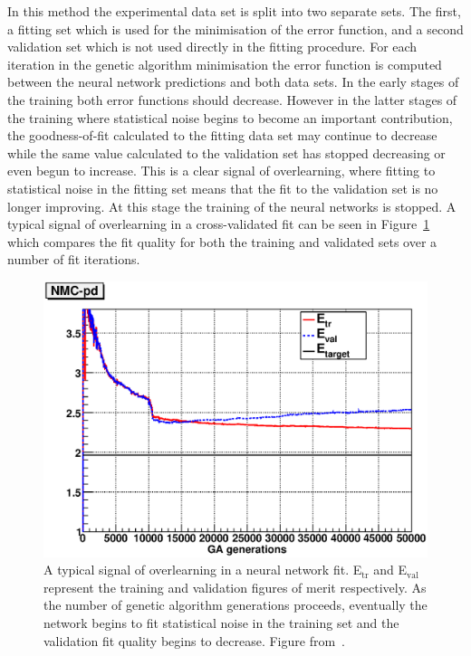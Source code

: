 In this method the experimental data set is split into two separate sets. The first, a fitting set which is used for the minimisation of the error function, and a second validation set which is not used directly in the fitting procedure. For each iteration in the genetic algorithm minimisation the error function is computed between the neural network predictions and both data sets. In the early stages of the training both error functions should decrease. However in the latter stages of the training where statistical noise begins to become an important contribution, the goodness-of-fit calculated to the fitting data set may continue to decrease while the same value calculated to the validation set has stopped decreasing or even begun to increase. This is a clear signal of overlearning, where fitting to statistical noise in the fitting set means that the fit to the validation set is no longer improving. At this stage the training of the neural networks is stopped. A typical signal of overlearning in a cross-validated fit can be seen in Figure~\ref{fig:crossval} which compares the fit quality for both the training and validated sets over a number of fit iterations.

\begin{figure}[ht]
\centering
\includegraphics[scale=0.5]{3-PDFdet/figs/chi2ite-1004-NMC-pd.eps}
\caption[Demonstration of overlearning in the cross-validation of a neural network fit]{A typical signal of overlearning in a neural network fit. E$_{\mathrm{tr}}$ and E$_{\mathrm{val}}$ represent the training and validation figures of merit respectively. As the number of genetic algorithm generations proceeds, eventually the network begins to fit statistical noise in the training set and the validation fit quality begins to decrease. Figure from~\cite{Ball:2010de}.}
\label{fig:crossval}
\end{figure}

